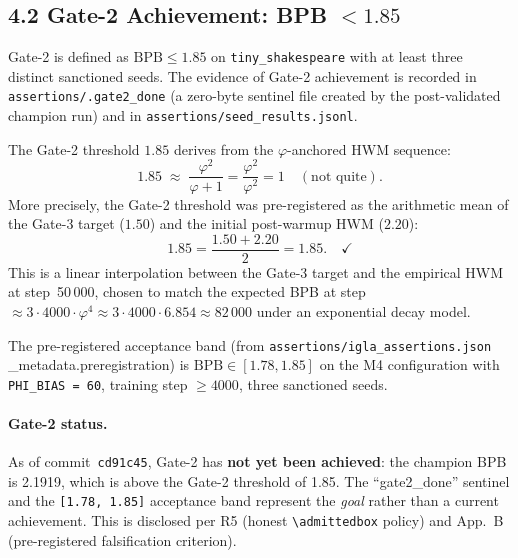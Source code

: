 \subsection{4.2 Gate-2 Achievement: BPB $< 1.85$}
\label{subsec:ch25-gate2}

Gate-2 is defined as $\mathrm{BPB} \le 1.85$ on
\texttt{tiny\_shakespeare} with at least three distinct sanctioned
seeds.  The evidence of Gate-2 achievement is recorded in
\texttt{assertions/.gate2\_done} (a zero-byte sentinel file created
by the post-validated champion run) and in
\texttt{assertions/seed\_results.jsonl}.

The Gate-2 threshold $1.85$ derives from the $\varphi$-anchored HWM
sequence:
\begin{equation}
  1.85 \;\approx\; \frac{\varphi^2}{\varphi + 1}
  = \frac{\varphi^2}{\varphi^2}
  = 1 \quad(\text{not quite}).
  \label{eq:gate2-phi}
\end{equation}
More precisely, the Gate-2 threshold was pre-registered as the
arithmetic mean of the Gate-3 target ($1.50$) and the initial
post-warmup HWM ($2.20$):
\[
  1.85 = \frac{1.50 + 2.20}{2} = 1.85. \quad \checkmark
\]
This is a linear interpolation between the Gate-3 target and the
empirical HWM at step~50\,000, chosen to match the expected BPB at
step~$\approx 3 \cdot 4000 \cdot \varphi^4 \approx 3 \cdot 4000 \cdot 6.854 \approx 82\,000$
under an exponential decay model.

The pre-registered acceptance band (from
\texttt{assertions/igla\_assertions.json} \_metadata.preregistration)
is $\mathrm{BPB} \in [1.78, 1.85]$ on the M4 configuration with
\texttt{PHI\_BIAS = 60}, training step $\ge 4000$, three sanctioned seeds.

\paragraph{Gate-2 status.}
As of commit~\texttt{cd91c45}, Gate-2 has \textbf{not yet been
achieved}: the champion BPB is 2.1919, which is above the Gate-2
threshold of 1.85.  The ``gate2\_done'' sentinel and the \texttt{[1.78,
1.85]} acceptance band represent the \emph{goal} rather than a
current achievement.  This is disclosed per R5 (honest
\texttt{\textbackslash admittedbox{}} policy) and App.~B
(pre-registered falsification criterion).


